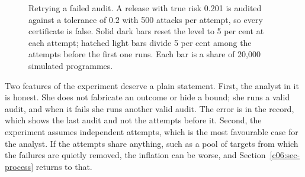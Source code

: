 \begin{figure}[ht]
\centering
{}
\caption{Retrying a failed audit. A release with true risk 0.201 is audited against
a tolerance of 0.2 with 500 attacks per attempt, so every certificate is false.
Solid dark bars reset the level to 5 per cent at each attempt; hatched light bars
divide 5 per cent among the attempts before the first one runs. Each bar is a share
of 20,000 simulated programmes.}
\label{c06:fig-retry}
\end{figure}

Two features of the experiment deserve a plain statement. First, the analyst in it
is honest. She does not fabricate an outcome or hide a bound; she runs a valid audit,
and when it fails she runs another valid audit. The error is in the record, which
shows the last audit and not the attempts before it. Second, the experiment
assumes independent attempts, which is the most favourable case for the analyst.
If the attempts share anything, such as a pool of targets from which the failures
are quietly removed, the inflation can be worse, and Section~\ref{c06:sec-process}
returns to that.

